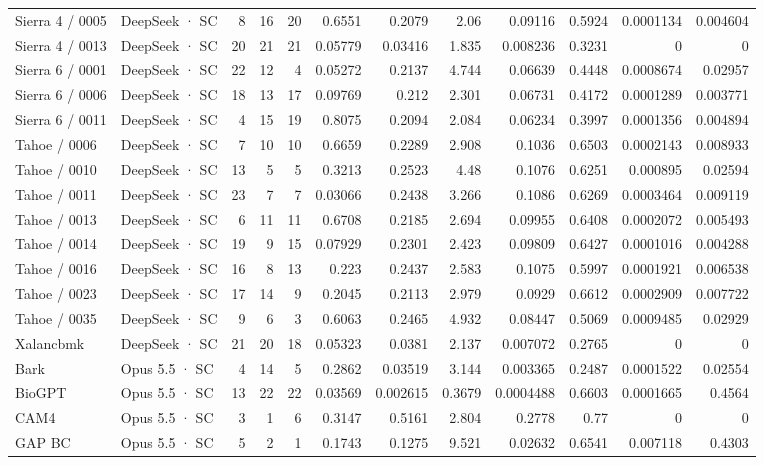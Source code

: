 \begin{tabular}{llrrrrrrrrrr}
Sierra 4 / 0005 & DeepSeek · SC & 8 & 16 & 20 & 0.6551 & 0.2079 & 2.06 & 0.09116 & 0.5924 & 0.0001134 & 0.004604 \\
Sierra 4 / 0013 & DeepSeek · SC & 20 & 21 & 21 & 0.05779 & 0.03416 & 1.835 & 0.008236 & 0.3231 & 0 & 0 \\
Sierra 6 / 0001 & DeepSeek · SC & 22 & 12 & 4 & 0.05272 & 0.2137 & 4.744 & 0.06639 & 0.4448 & 0.0008674 & 0.02957 \\
Sierra 6 / 0006 & DeepSeek · SC & 18 & 13 & 17 & 0.09769 & 0.212 & 2.301 & 0.06731 & 0.4172 & 0.0001289 & 0.003771 \\
Sierra 6 / 0011 & DeepSeek · SC & 4 & 15 & 19 & 0.8075 & 0.2094 & 2.084 & 0.06234 & 0.3997 & 0.0001356 & 0.004894 \\
Tahoe / 0006 & DeepSeek · SC & 7 & 10 & 10 & 0.6659 & 0.2289 & 2.908 & 0.1036 & 0.6503 & 0.0002143 & 0.008933 \\
Tahoe / 0010 & DeepSeek · SC & 13 & 5 & 5 & 0.3213 & 0.2523 & 4.48 & 0.1076 & 0.6251 & 0.000895 & 0.02594 \\
Tahoe / 0011 & DeepSeek · SC & 23 & 7 & 7 & 0.03066 & 0.2438 & 3.266 & 0.1086 & 0.6269 & 0.0003464 & 0.009119 \\
Tahoe / 0013 & DeepSeek · SC & 6 & 11 & 11 & 0.6708 & 0.2185 & 2.694 & 0.09955 & 0.6408 & 0.0002072 & 0.005493 \\
Tahoe / 0014 & DeepSeek · SC & 19 & 9 & 15 & 0.07929 & 0.2301 & 2.423 & 0.09809 & 0.6427 & 0.0001016 & 0.004288 \\
Tahoe / 0016 & DeepSeek · SC & 16 & 8 & 13 & 0.223 & 0.2437 & 2.583 & 0.1075 & 0.5997 & 0.0001921 & 0.006538 \\
Tahoe / 0023 & DeepSeek · SC & 17 & 14 & 9 & 0.2045 & 0.2113 & 2.979 & 0.0929 & 0.6612 & 0.0002909 & 0.007722 \\
Tahoe / 0035 & DeepSeek · SC & 9 & 6 & 3 & 0.6063 & 0.2465 & 4.932 & 0.08447 & 0.5069 & 0.0009485 & 0.02929 \\
Xalancbmk & DeepSeek · SC & 21 & 20 & 18 & 0.05323 & 0.0381 & 2.137 & 0.007072 & 0.2765 & 0 & 0 \\
Bark & Opus 5.5 · SC & 4 & 14 & 5 & 0.2862 & 0.03519 & 3.144 & 0.003365 & 0.2487 & 0.0001522 & 0.02554 \\
BioGPT & Opus 5.5 · SC & 13 & 22 & 22 & 0.03569 & 0.002615 & 0.3679 & 0.0004488 & 0.6603 & 0.0001665 & 0.4564 \\
CAM4 & Opus 5.5 · SC & 3 & 1 & 6 & 0.3147 & 0.5161 & 2.804 & 0.2778 & 0.77 & 0 & 0 \\
GAP BC & Opus 5.5 · SC & 5 & 2 & 1 & 0.1743 & 0.1275 & 9.521 & 0.02632 & 0.6541 & 0.007118 & 0.4303 \\

\end{tabular}
